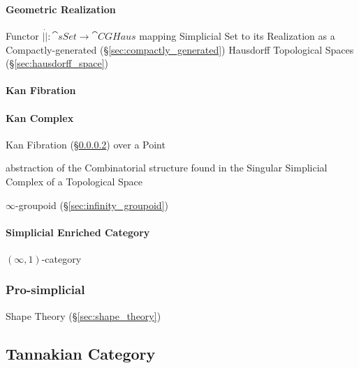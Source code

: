 \paragraph{Geometric Realization}\label{sec:geometric_realization}\hfill

Functor $|\dot| : \cat{sSet} \rightarrow \cat{CGHaus}$ mapping
Simplicial Set to its Realization as a Compactly-generated
(\S\ref{sec:compactly_generated}) Hausdorff Topological Spaces
(\S\ref{sec:hausdorff_space})



\paragraph{Kan Fibration}\label{sec:kan_fibration}\hfill

\paragraph{Kan Complex}\label{sec:kan_complex}\hfill

Kan Fibration (\S\ref{sec:kan_fibration}) over a Point

abstraction of the Combinatorial structure found in the Singular
Simplicial Complex of a Topological Space %

$\infty$-groupoid (\S\ref{sec:infinity_groupoid})



\paragraph{Simplicial Enriched Category}\hfill
\label{sec:simplicial_enriched}

$(\infty,1)$-category %



\subsubsection{Pro-simplicial}\label{sec:pro_simplicial}

Shape Theory (\S\ref{sec:shape_theory})



\subsection{Tannakian Category}\label{sec:tannakian_category}

